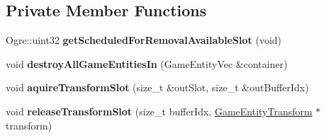 \subsection*{Private Member Functions}
\begin{DoxyCompactItemize}
\item 
\mbox{\label{class_common_1_1_game_entity_manager_a1f5d1d6fa7658fb1b09d38933c3d04d1}} 
Ogre\+::uint32 {\bfseries get\+Scheduled\+For\+Removal\+Available\+Slot} (void)
\item 
\mbox{\label{class_common_1_1_game_entity_manager_a337fbb5e1e9cdd57694c9f87f792ae24}} 
void {\bfseries destroy\+All\+Game\+Entities\+In} (Game\+Entity\+Vec \&container)
\item 
\mbox{\label{class_common_1_1_game_entity_manager_a6c10977c6e16842aab2e5e230f5039df}} 
void {\bfseries aquire\+Transform\+Slot} (size\+\_\+t \&out\+Slot, size\+\_\+t \&out\+Buffer\+Idx)
\item 
\mbox{\label{class_common_1_1_game_entity_manager_a409b2f64087e2e8443d6dbe9cd61c928}} 
void {\bfseries release\+Transform\+Slot} (size\+\_\+t buffer\+Idx, \hyperlink{struct_common_1_1_game_entity_transform}{Game\+Entity\+Transform} $\ast$transform)
\end{DoxyCompactItemize}
